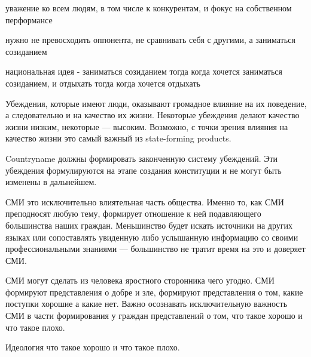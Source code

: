 \documentclass[11pt]{article}
\theoremstyle{remark}
\theoremstyle{definition}
\begin{document}
уважение ко всем людям, в том числе к конкурентам, и фокус на собственном перформансе


нужно не превосходить оппонента, не сравнивать себя с другими, а заниматься созиданием

национальная идея - заниматься созиданием тогда когда хочется заниматься созиданием, и отдыхать тогда когда хочется отдыхать


\color{blue}

Убеждения, которые имеют люди, оказывают громадное влияние на их поведение, а следовательно и на качество их жизни. Некоторые убеждения делают качество жизни низким, некоторые --- высоким. Возможно, с точки зрения влияния на качество жизни это самый важный из state-forming products.

Countryname должны формировать законченную систему убеждений. Эти убеждения формулируются на этапе создания конституции и не могут быть изменены в дальнейшем.

СМИ это исключительно влиятельная часть общества. Именно то, как СМИ преподносят любую тему, формирует отношение к ней подавляющего большинства наших граждан. Меньшинство будет искать источники на других языках или сопоставлять увиденную либо услышанную информацию со своими профессиональными знаниями --- большинство не тратит время на это и доверяет СМИ.

СМИ могут сделать из человека яростного сторонника чего угодно. СМИ формируют представления о добре и зле, формируют представления о том, какие поступки хорошие а какие нет. Важно осознавать исключительную важность СМИ в части формирования у граждан представлений о том, что такое хорошо и что такое плохо. 




Идеология что такое хорошо и что такое плохо.
\end{document}
